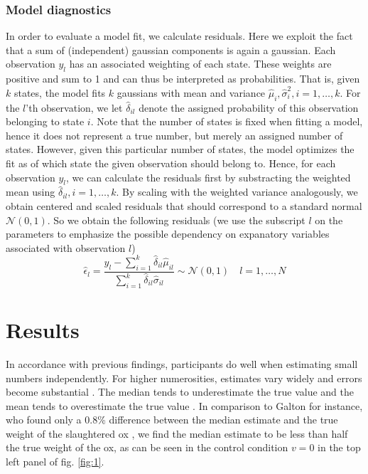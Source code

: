 \documentclass[10pt,a4paper,twocolumn,lineno]{article}
\begin{document}
\subsubsection{Model diagnostics}
\noindent
In order to evaluate a model fit, we calculate residuals. Here we exploit the fact that a sum of (independent) gaussian components is again a gaussian. Each observation $y_l$ has an associated weighting of each state. These weights are positive and sum to 1 and can thus be interpreted as probabilities. That is, given $k$ states, the model fits $k$ gaussians with mean and variance $\hat{\mu}_i, \hat{\sigma}_i^2, i=1,\dots, k$. For the $l$'th observation, we let $\hat{\delta}_{il}$ denote the assigned probability of this observation belonging to state $i$. Note that the number of states is fixed when fitting a model, hence it does not represent a true number, but merely an assigned number of states. However, given this particular number of states, the model optimizes the fit as of which state the given observation should belong to.
Hence, for each observation $y_l$, we can calculate the residuals first by substracting the weighted mean using $\hat{\delta}_{il}, i=1,\dots,k$. By scaling with the weighted variance analogously, we obtain centered and scaled residuals that should correspond to a standard normal $\mathcal{N}(0,1)$. So we obtain the following residuals (we use the subscript $l$ on the parameters to emphasize the possible dependency on expanatory variables associated with observation $l$)
$$
  \hat{\epsilon}_l = \frac{y_l-\sum_{i=1}^k\hat{\delta}_{il}\hat{\mu}_{il} }{\sum_{i=1}^k\hat{\delta}_{il} \hat{\sigma}_{il}}\sim\mathcal{N}(0,1)\quad l=1,\dots,N
$$

\section{Results}
In accordance with previous findings, participants do well when estimating small numbers independently. For higher numerosities, estimates vary widely and errors become substantial \cite{izard2008calibrating, krueger1982single, krueger1984perceived}. The median tends to underestimate the true value and the mean tends to overestimate the true value \cite{kao2018counteracting}. In comparison to Galton for instance, who found only a 0.8\% difference between the median estimate and the true weight of the slaughtered ox \cite{galton1907vox}, we find the median estimate to be less than half the true weight of the ox, as can be seen in the control condition $v=0$ in the top left panel of fig. \ref{fig:1}.
\end{document}
